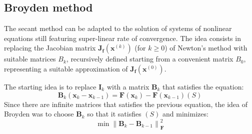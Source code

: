 \documentclass[12pt, a4paper]{report}
\newtheorem[style=M,bodystyle=\normalfont]{theorem}{Theorem}
\newtheorem[style=M,bodystyle=\normalfont]{proposition}{Proposition}
\newtheorem[style=M,bodystyle=\normalfont]{corollary}{Corollary}
\newtheorem[style=M,bodystyle=\normalfont]{lemma}{Lemma}
\newtheorem[style=M,bodystyle=\normalfont]{definition}{Definition}
\begin{document}
    \subsection{Broyden method}
    The secant method can be adapted to the solution of systems of nonlinear equations still featuring super-linear rate of convergence. The idea consists in replacing the Jacobian 
    matrix $\boldsymbol{J}_{\boldsymbol{f}}(\boldsymbol{x}^{(k)})$ (for $k \geq 0$) of Newton's method with suitable matrices $B_k$, recursively defined starting from a convenient matrix $B_0$, 
    representing a suitable approximation of $\boldsymbol{J}_{\boldsymbol{f}}(\boldsymbol{x}^{(0)})$.
    
    The starting idea is to replace $\boldsymbol{I}_k$ with a matrix $\boldsymbol{B}_k$ that satisfies the equation: 
    \[\boldsymbol{B}_k\left(\boldsymbol{x}_k-\boldsymbol{x}_{k-1}\right)=\boldsymbol{F}(\boldsymbol{x}_k)-\boldsymbol{F}(\boldsymbol{x}_{k-1})(S)\]
    Since there are infinite matrices that satisfies the previous equation, the idea of Broyden was to choose $\boldsymbol{B}_k$ so that it satisfies $(S)$ and minimizes: 
    \[\min{\left\lVert \boldsymbol{B}_k-\boldsymbol{B}_{k-1} \right\rVert_{\boldsymbol{F}}^{2}}\]
\end{document}
